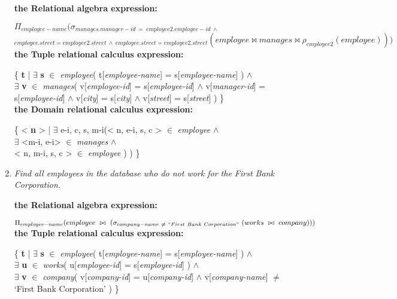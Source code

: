 \documentclass[paper=8.27in:11.69in, 14pt, DIV=calc]{scrartcl}
\begin{document}
\begin{enumerate}[label=\alph*)]
\textbf{the Relational algebra expression:\\}

$\Pi_{employee-name}(\sigma_{manages.manager-id \ = \ employee2.employee-id \ \wedge}$\\
$_{employee.street = employee2.street \ \wedge \ employee.street = employee2.street}(employee \bowtie manages \bowtie \rho_{employee2}(employee)))$\\

\textbf{the Tuple relational calculus expression:\\}

\{ \textbf{t} | $\exists$ \textbf{s} $\in$ \textit{employee}( t[\textit{employee-name}] = s[\textit{employee-name}] ) $\wedge$ \\ $\exists$ \textbf{v} $\in$ \textit{manages}( v[\textit{employee-id}] = s[\textit{employee-id}] $\wedge$ v[\textit{manager-id}] = s[\textit{employee-id}] $\wedge$ v[\textit{city}] = s[\textit{city}] $\wedge$ v[\textit{street}] = s[\textit{street}]  ) \}\\

\textbf{the Domain relational calculus expression:\\}

\{ < \textbf{n} > | $\exists$ e-i, c, s, m-i(< n, e-i, s, c > $\in$ \textit{employee} $\wedge$ \\ $\exists$ <m-i, e-i> $\in$ \textit{manages} $\wedge$ \\ < n, m-i, s, c > $\in$ \textit{employee} ) ) \}\\

\newpage

\item \textit{Find all employees in the database who do not work for the First Bank Corporation.\\}

\textbf{the Relational algebra expression:\\}

$\Pi_{employee-name}(employee \ \bowtie \ (\sigma_{company-name \ \neq \ ``First \ Bank \ Corporation"} \ (works \ \bowtie \ company)))$\\

\textbf{the Tuple relational calculus expression:\\}

\{ \textbf{t} | $\exists$ \textbf{s} $\in$ \textit{employee}( t[\textit{employee-name}] = s[\textit{employee-name}] ) $\wedge$ \\ $\exists$ \textbf{u} $\in$ \textit{works}( u[\textit{employee-id}] = s[\textit{employee-id}] ) $\wedge$ \\ $\exists$ \textbf{v} $\in$ \textit{company}( v[\textit{company-id}] = u[\textit{company-id}] $\wedge$ v[\textit{company-name}] $\neq$ `First Bank Corporation' ) \}\\


\end{enumerate}
\end{document}
